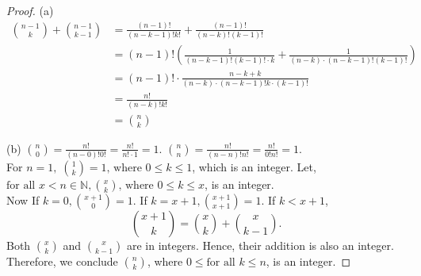 \documentclass[12pt]{article}
\begin{document}
\begin{proof}
(a) \begin{align*}
\binom{n -1}{k} + \binom{n - 1}{k - 1}
& = \frac{(n-1)!}{(n-k-1)!k!} + \frac{(n-1)!}{(n-k)!(k-1)!} \\
& = (n-1)! \left( \frac{1}{(n-k-1)!(k-1)!\cdot k} + \frac{1}{(n-k)\cdot (n-k-1)!(k-1)!} \right) \\
& = (n-1)!\cdot \frac{n-k+k}{(n-k)\cdot (n-k-1)! k\cdot (k-1)!} \\
& = \frac{n!}{(n-k)!k!} \\
& = \binom{n}{k}
\end{align*}

(b) $\binom{n}{0} = \frac{n!}{(n-0)!0!} = \frac{n!}{n!\cdot 1} = 1$. $\binom{n}{n} = \frac{n!}{(n-n)!n!} = \frac{n!}{0!n!} = 1$.\\
For $n = 1, \; \binom{1}{k} = 1 \text{, where } 0 \leq k \leq 1$, which is an integer. Let, $\text{for all } x < n \in \mathbb{N}, \binom{x}{k} \text{, where } 0 \leq k \leq x$, is an integer. \\
Now If $k = 0, \binom{x + 1}{0} = 1$. If $k = x + 1, \binom{x + 1}{x + 1} = 1$.
If $k < x + 1$,
\[
\binom{x + 1}{k} = \binom{x}{k} + \binom{x}{k - 1}.
\]
Both $\binom{x}{k}$ and $\binom{x}{k - 1}$ are in integers. Hence, their addition is also an integer. Therefore, we conclude $\binom{n}{k}$, where $0 \leq \text{for all } k \leq n$, is an integer.


\end{proof}
\end{document}
